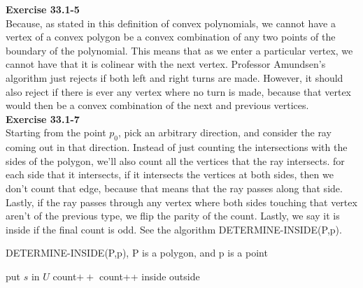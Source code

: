 \documentclass{article}
\begin{document}
\noindent\textbf{Exercise 33.1-5}\\

Because, as stated in this definition of convex polynomials, we cannot have a vertex of a convex polygon be a convex combination of any two points of the boundary of the polynomial. This means that as we enter a particular vertex, we cannot have that it is colinear with the next vertex. Professor Amundsen's algorithm just rejects if both left and right turns are made. However, it should also reject if there is ever any vertex where no turn is made, because that vertex would then be a convex combination of the next and previous vertices.\\



\noindent\textbf{Exercise 33.1-7}\\

Starting from the point $p_0$, pick an arbitrary direction, and consider the ray coming out in that direction. Instead of just counting the intersections with the sides of the polygon, we'll also count all the vertices that the ray intersects. for each side that it intersects, if it intersects the vertices at both sides, then we don't count that edge, because that means that the ray passes along that side. Lastly, if the ray passes through any vertex where both sides touching that vertex aren't of the previous type, we flip the parity of the count. Lastly, we say it is inside if the final count is odd. See the algorithm DETERMINE-INSIDE(P,p).\\

\begin{algorithm}
\caption{DETERMINE-INSIDE(P,p), P is a polygon, and p is a point}
\begin{algorithmic}
\State put $s$ in $U$
\EndIf
\State count$++$
\EndFor
{}
\State count++
\EndIf
\EndFor
{}
\State \Return inside
\Else
\State \Return outside
\EndIf
\end{algorithmic}
\end{algorithm}
\end{document}
